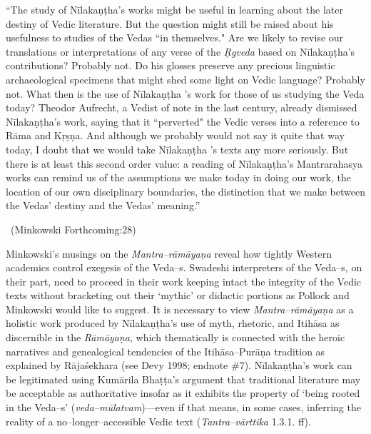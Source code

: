 \begin{myquote}
“The study of Nīlakaṇṭha's works might be useful in learning about the later destiny of Vedic literature. But the question might still be raised about his usefulness to studies of the Vedas “in themselves." Are we likely to revise our translations or interpretations of any verse of the \textit{Ṛgveda} based on Nīlakaṇṭha's contributions? Probably not. Do his glosses preserve any precious linguistic archaeological specimens that might shed some light on Vedic language? Probably not. What then is the use of Nīlakaṇṭha 's work for those of us studying the Veda today? Theodor Aufrecht, a Vedist of note in the last century, already dismissed Nīlakaṇṭha's work, saying that it ``perverted" the Vedic verses into a reference to Rāma and Kṛṣṇa. And although we probably would not say it quite that way today, I doubt that we would take Nīlakaṇṭha 's texts any more seriously. But there is at least this second order value: a reading of Nīlakaṇṭha's Mantrarahasya works can remind us of the assumptions we make today in doing our work, the location of our own disciplinary boundaries, the distinction that we make between the Vedas' destiny and the Vedas' meaning.” 

~\hfill (Minkowski Forthcoming:28)
\end{myquote}

Minkowski’s musings on the \textit{Mantra–rāmāyaṇa} reveal how tightly Western academics control exegesis of the Veda–s. Swadeshi interpreters of the Veda–s, on their part, need to proceed in their work keeping intact the integrity of the Vedic texts without bracketing out their ‘mythic’ or didactic portions as Pollock and Minkowski would like to suggest. It is necessary to view \textit{Mantra–rāmāyaṇa} as a holistic work produced by Nīlakaṇṭha’s use of myth, rhetoric, and Itihāsa as discernible in the \textit{Rāmāyaṇa}, which thematically is connected with the heroic narratives and genealogical tendencies of the Itihāsa–Purāṇa tradition as explained by Rājaśekhara (see Devy 1998; endnote \#7). Nīlakaṇṭha’s work can be legitimated using Kumārila Bhaṭṭa’s argument that traditional literature may be acceptable as authoritative insofar as it exhibits the property of ‘being rooted in the Veda–s’ (\textit{veda–mūlatvam})—even if that means, in some cases, inferring the reality of a no–longer–accessible Vedic text (\textit{Tantra–vārttika} 1.3.1. ff).


